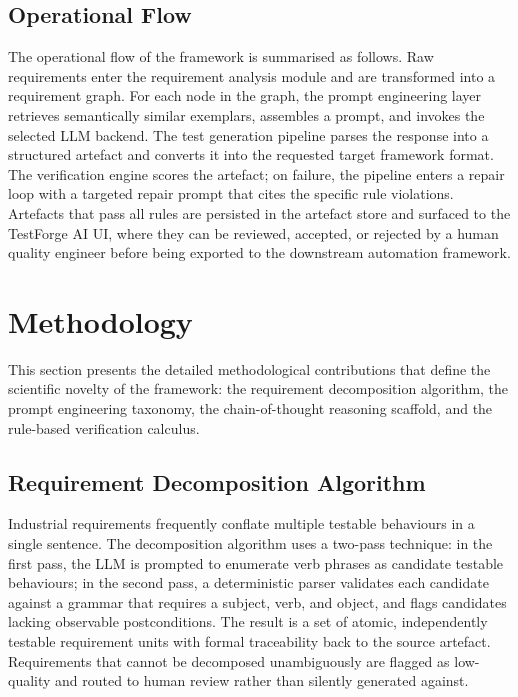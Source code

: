 \documentclass[conference]{IEEEtran}
\begin{document}
\subsection{Operational Flow}

The operational flow of the framework is summarised as follows. Raw requirements enter the requirement analysis module and are transformed into a requirement graph. For each node in the graph, the prompt engineering layer retrieves semantically similar exemplars, assembles a prompt, and invokes the selected LLM backend. The test generation pipeline parses the response into a structured artefact and converts it into the requested target framework format. The verification engine scores the artefact; on failure, the pipeline enters a repair loop with a targeted repair prompt that cites the specific rule violations. Artefacts that pass all rules are persisted in the artefact store and surfaced to the TestForge AI UI, where they can be reviewed, accepted, or rejected by a human quality engineer before being exported to the downstream automation framework.

\begin{table}[!t]
\centering
\caption{Responsibilities, inputs, and outputs of each RAITG subsystem}
\label{tab:raitg_subsystems}


\end{table}

\section{Methodology}
\label{sec:methodology}

This section presents the detailed methodological contributions that define the scientific novelty of the framework: the requirement decomposition algorithm, the prompt engineering taxonomy, the chain-of-thought reasoning scaffold, and the rule-based verification calculus.

\subsection{Requirement Decomposition Algorithm}

Industrial requirements frequently conflate multiple testable behaviours in a single sentence. The decomposition algorithm uses a two-pass technique: in the first pass, the LLM is prompted to enumerate verb phrases as candidate testable behaviours; in the second pass, a deterministic parser validates each candidate against a grammar that requires a subject, verb, and object, and flags candidates lacking observable postconditions. The result is a set of atomic, independently testable requirement units with formal traceability back to the source artefact. Requirements that cannot be decomposed unambiguously are flagged as low-quality and routed to human review rather than silently generated against.
\end{document}

